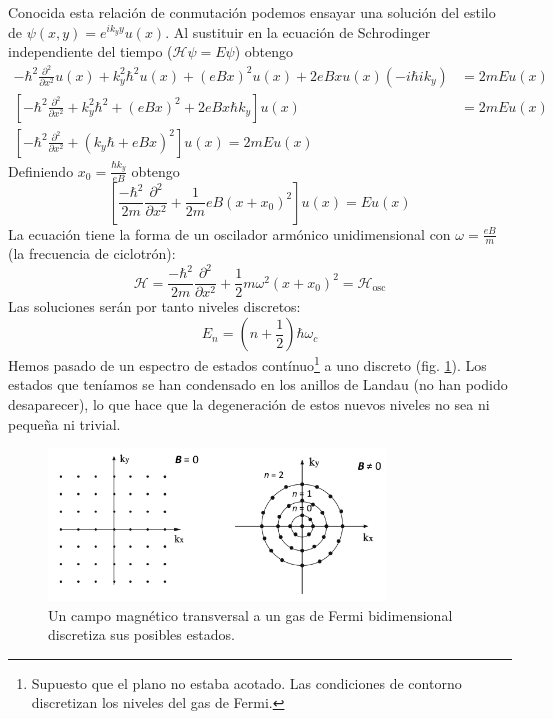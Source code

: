 Conocida esta relación de conmutación podemos ensayar una solución del
estilo de $\psi(x,y) = e^{i k_y y} u(x)$. Al sustituir en la ecuación
de Schrodinger independiente del tiempo ($\mathcal{H} \psi = E \psi$) obtengo
\begin{equation}
  \begin{split}
    - \hbar^2 \frac{\partial^2}{\partial x^2} u(x) + k_y ^2 \hbar^2
    u(x) + (eBx)^2 u(x) + 2eBx u(x)(-i \hbar i k_y) &= 2m E u(x) \\
    \left[ -\hbar^2 \frac{\partial^2}{\partial x^2} + k_y^2 \hbar^2 +
      (eBx)^2 + 2eBx \hbar k_y \right] u(x) &= 2m E u(x) \\
    \left[  -\hbar^2 \frac{\partial^2}{\partial x^2} + (k_y \hbar +
      eBx)^2 \right] u(x) = 2m E u(x)
  \end{split}
\end{equation}
Definiendo $x_0 = \frac{\hbar k_y}{eB}$ obtengo
\begin{equation}
  \left[  \frac{-\hbar^2}{2m} \frac{\partial^2}{\partial x^2} +
    \frac{1}{2m} eB (x+x_0)^2 \right] u(x) = E u(x)
\end{equation}
La ecuación tiene la forma de un oscilador armónico unidimensional con
$\omega = \frac{eB}{m}$ (la frecuencia de ciclotrón):
\begin{equation}
  \mathcal{H} =   \frac{-\hbar^2}{2m} \frac{\partial^2}{\partial x^2} +
    \frac{1}{2} m \omega^2 (x+x_0)^2 = \mathcal{H}_\text{osc}
\end{equation}
Las soluciones serán por tanto niveles discretos:
\begin{equation}
  E_n = \left( n + \frac{1}{2} \right) \hbar \omega_c \tag{Landau levels}
\end{equation}
Hemos pasado de un espectro de estados contínuo\footnote{Supuesto que
  el plano no estaba acotado. Las condiciones de contorno discretizan
  los niveles del gas de Fermi.} a uno discreto
(fig. \ref{fig:landaurings}). Los estados que teníamos se han
condensado en los anillos de Landau (no han podido desaparecer), lo
que hace que la degeneración de estos nuevos niveles no sea ni pequeña
ni trivial.

\begin{figure}
  \centering
  \includegraphics[width=0.8\textwidth]{figures/landaurings.png}
  \caption{Un campo magnético transversal a un gas de Fermi
    bidimensional discretiza sus posibles estados. }
  \label{fig:landaurings}
\end{figure}

